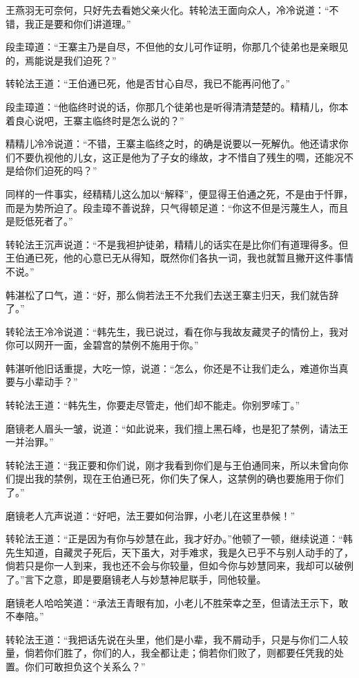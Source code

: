 \documentclass[12pt,oneside]{book}
\begin{document}
王燕羽无可奈何，只好先去看她父亲火化。转轮法王面向众人，冷冷说道：``不错，我正是要和你们讲道理。''

段圭璋道：``王寨主乃是自尽，不但他的女儿可作证明，你那几个徒弟也是亲眼见的，焉能说是我们迫死？''

转轮法王道：``王伯通已死，他是否甘心自尽，我已不能再问他了。''

段圭璋道：``他临终时说的话，你那几个徒弟也是听得清清楚楚的。精精儿，你本着良心说吧，王寨主临终时是怎么说的？''

精精儿冷冷说道：``不错，王寨主临终之时，的确是说要以一死解仇。他还请求你们不要仇视他的儿女，这正是他为了子女的缘故，才不惜自了残生的啁，还能况不是给你们迫死的吗？''

同样的一件事实，经精精儿这么加以``解释''，便显得王伯通之死，不是由于忏罪，而是为势所迫了。段圭璋不善说辞，只气得顿足道：``你这不但是污蔑生人，而且是贬低死者了。''

转轮法王沉声说道：``不是我袒护徒弟，精精儿的话实在是比你们有道理得多。但王伯通已死，他的心意已无从得知，既然你们各执一词，我也就暂且撇开这件事情不说。''

韩湛松了口气，道：``好，那么倘若法王不允我们去送王寨主归天，我们就告辞了。''

转轮法王冷冷说道：``韩先生，我已说过，看在你与我故友藏灵子的情份上，我对你可以网开一面，金碧宫的禁例不施用于你。''

韩湛听他旧话重提，大吃一惊，说道：``怎么，你还是不让我们走么，难道你当真要与小辈动手？''

转轮法王道：``韩先生，你要走尽管走，他们却不能走。你别罗嗦丁。''

磨镜老人眉头一皱，说道：``如此说来，我们擅上黑石峰，也是犯了禁例，请法王一并治罪。''

转轮法王道：``我正要和你们说，刚才我看到你们是与王伯通同来，所以未曾向你们提出我的禁例，现在王伯通已死，你们失了保人，这禁例的确也要施用于你们了。''

磨镜老人亢声说道：``好吧，法王要如何治罪，小老儿在这里恭候！''

转轮法王道：``正是因为有你与妙慧在此，我才好办。''他顿了一顿，继续说道：``韩先生知道，自藏灵子死后，天下虽大，对手难求，我是久已乎不与别人动手的了，倘若只是你一人到来，我也还不会与你较量，但如今你与妙慧同来，我却可以破例了。''言下之意，即是要磨镜老人与妙慧神尼联手，同他较量。

磨镜老人哈哈笑道：``承法王青眼有加，小老儿不胜荣幸之至，但请法王示下，敢不奉陪。''

转轮法王道：``我把话先说在头里，他们是小辈，我不屑动手，只是与你们二人较量，倘若你们胜了，你们的人，我全都让走；倘若你们败了，则都要任凭我的处置。你们可敢担负这个关系么？''
\end{document}

